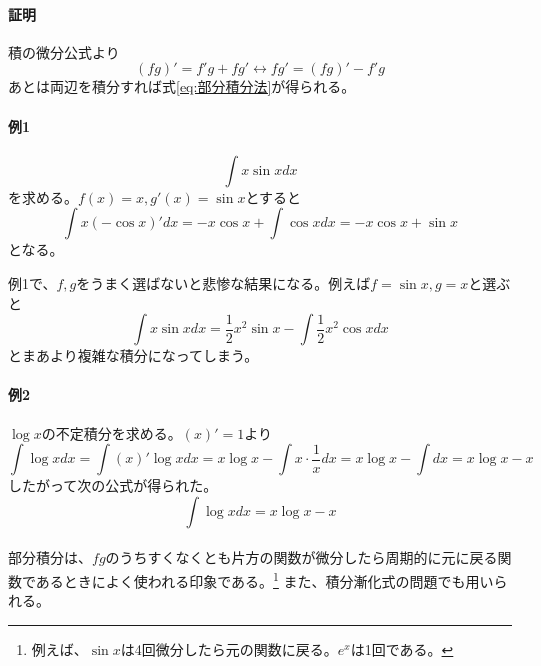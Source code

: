 \documentclass[a4j,dvipdfmx]{jsarticle}
\begin{document}
                \paragraph{証明}積の微分公式より
                \begin{equation}
                    (fg)'=f'g+fg' \leftrightarrow fg' = (fg)'-f'g
                \end{equation}
                あとは両辺を積分すれば式\eqref{eq:部分積分法}が得られる。

                \paragraph{例1}
                \begin{equation*}
                    \int x\sin x dx
                \end{equation*}
                を求める。$f(x)=x,g'(x)=\sin x$とすると
                \begin{equation*}
                    \int x(-\cos x)'dx = -x\cos x + \int \cos xdx = -x\cos x+\sin x
                \end{equation*}
                となる。

                例1で、$f,g$をうまく選ばないと悲惨な結果になる。例えば$f=\sin x,g=x$と選ぶと
                \begin{equation*}
                    \int x\sin xdx=\frac{1}{2}x^2\sin x - \int \frac{1}{2}x^2\cos xdx
                \end{equation*}
                とまあより複雑な積分になってしまう。

                \paragraph{例2}$\log x$の不定積分を求める。$(x)'=1$より
                \begin{equation*}
                    \int \log xdx=\int (x)'\log xdx=x\log x - \int x\cdot \frac{1}{x}dx=x\log x-\int dx=x\log x-x
                \end{equation*}
                したがって次の公式が得られた。
                \begin{equation}
                    \int \log xdx=x\log x-x\label{eq:log xの不定積分}
                \end{equation}\\

                部分積分は、$fg$のうちすくなくとも片方の関数が微分したら周期的に元に戻る関数であるときによく使われる印象である。\footnote{例えば、$\sin x$は4回微分したら元の関数に戻る。$e^x$は1回である。}
                また、積分漸化式の問題でも用いられる。
            \clearpage
\end{document}

